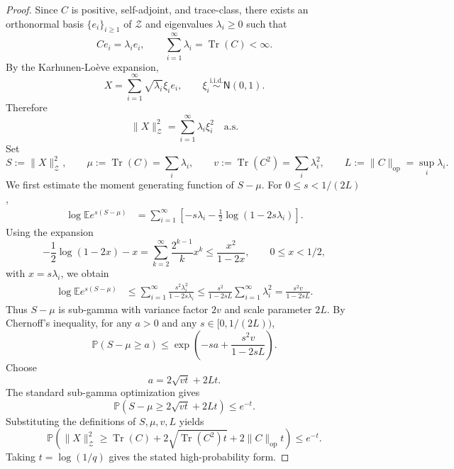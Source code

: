 \documentclass[11pt]{article}
\begin{document}
\begin{proof}
Since $C$ is positive, self-adjoint, and trace-class, there exists an orthonormal basis
$\{e_i\}_{i\ge 1}$ of $\mathcal Z$ and eigenvalues $\lambda_i\ge 0$ such that
\[
    Ce_i=\lambda_i e_i,
    \qquad
    \sum_{i=1}^\infty \lambda_i=\operatorname{Tr}(C)<\infty .
\]
By the Karhunen-Lo\`eve expansion,
\[
    X=\sum_{i=1}^\infty \sqrt{\lambda_i}\xi_i e_i,
    \qquad
    \xi_i\overset{\mathrm{i.i.d.}}{\sim}\mathsf N(0,1).
\]
Therefore
\[
    \|X\|_{\mathcal Z}^2
    =
    \sum_{i=1}^\infty \lambda_i\xi_i^2
    \quad\text{a.s.}
\]
Set
\[
    S:=\|X\|_{\mathcal Z}^2,
    \qquad
    \mu:=\operatorname{Tr}(C)=\sum_i\lambda_i,
    \qquad
    v:=\operatorname{Tr}(C^2)=\sum_i\lambda_i^2,
    \qquad
    L:=\|C\|_{\mathrm{op}}=\sup_i\lambda_i .
\]
We first estimate the moment generating function of $S-\mu$. For $0\le s<1/(2L)$,
\[
\begin{aligned}
    \log \mathbb E e^{s(S-\mu)}
    &=
    \sum_{i=1}^\infty
    \left[
    -s\lambda_i
    -
    \frac12\log(1-2s\lambda_i)
    \right].
\end{aligned}
\]
Using the expansion
\[
    -\frac12\log(1-2x)-x
    =
    \sum_{k=2}^\infty \frac{2^{k-1}}{k}x^k
    \le
    \frac{x^2}{1-2x},
    \qquad 0\le x<1/2,
\]
with $x=s\lambda_i$, we obtain
\[
\begin{aligned}
    \log \mathbb E e^{s(S-\mu)}
    &\le
    \sum_{i=1}^\infty
    \frac{s^2\lambda_i^2}{1-2s\lambda_i}\le
    \frac{s^2}{1-2sL}
    \sum_{i=1}^\infty \lambda_i^2
    =
    \frac{s^2v}{1-2sL}.
\end{aligned}
\]
Thus $S-\mu$ is sub-gamma with variance factor $2v$ and scale parameter $2L$. By Chernoff's inequality, for any $a>0$ and any $s\in[0,1/(2L))$,
\[
    \mathbb P(S-\mu\ge a)
    \le
    \exp
    \left(
    -sa+\frac{s^2v}{1-2sL}
    \right).
\]
Choose
\[
    a=2\sqrt{vt}+2Lt.
\]
The standard sub-gamma optimization gives
\[
    \mathbb P
    \left(
    S-\mu\ge 2\sqrt{vt}+2Lt
    \right)
    \le
    e^{-t}.
\]
Substituting the definitions of $S,\mu,v,L$ yields
\[
    \mathbb P
    \left(
    \|X\|_{\mathcal Z}^2
    \ge
    \operatorname{Tr}(C)
    +
    2\sqrt{\operatorname{Tr}(C^2)t}
    +
    2\|C\|_{\mathrm{op}}t
    \right)
    \le
    e^{-t}.
\]
Taking $t=\log(1/q)$ gives the stated high-probability form.
\end{proof}
\end{document}
